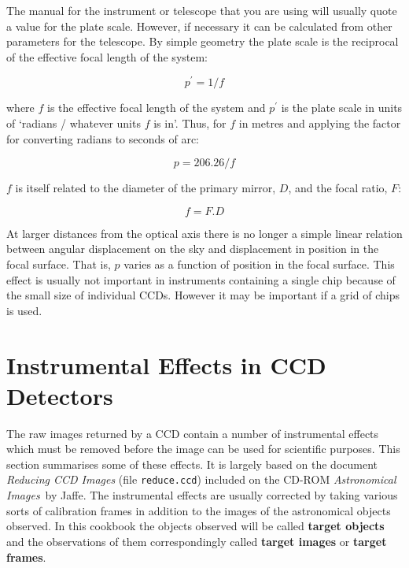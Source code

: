 \documentclass[twoside,11pt]{starlink}
\begin{document}
The manual for the instrument or telescope that you are using will usually
quote a value for the plate scale.  However, if necessary it can be
calculated from other parameters for the telescope.  By simple geometry
the plate scale is the reciprocal of the effective focal length of the
system:

\begin{equation}
p^{\prime} = 1 / f
\end{equation}

where $f$ is the effective focal length of the system and $p^{\prime}$ is the
plate scale in units of `radians / whatever units $f$ is in'.  Thus, for
$f$ in metres and applying the factor for converting radians to seconds
of arc:

\begin{equation}
p = 206.26 / f
\end{equation}

$f$ is itself related to the diameter of the primary mirror, $D$, and
the focal ratio, $F$:

\begin{equation}
f = F . D
\end{equation}

At larger distances from the optical axis there is no longer a simple
linear relation between angular displacement on the sky and displacement
in position in the focal surface.  That is, $p$ varies as a function of
position in the focal surface.  This effect is usually not important
in instruments containing a single chip because of the small size of
individual CCDs.  However it may be important if a grid of chips is used.


\section{\label{EASY}Instrumental Effects in CCD Detectors}

The raw images returned by a CCD contain a number of instrumental
effects which must be removed before the image can be used for scientific
purposes.  This section summarises some of these effects.  It is largely
based on the document \textit{Reducing CCD Images}\/ (file \texttt{reduce.ccd})
included on the CD-ROM \textit{Astronomical Images}\, by Jaffe\cite{JAFFE98}.
The instrumental effects are usually corrected by taking various sorts
of calibration frames in addition to the images of the astronomical objects
observed.  In this cookbook the objects observed will be called \textbf{target objects} and the observations of them correspondingly called \textbf{target images} or \textbf{target frames}.
\end{document}

